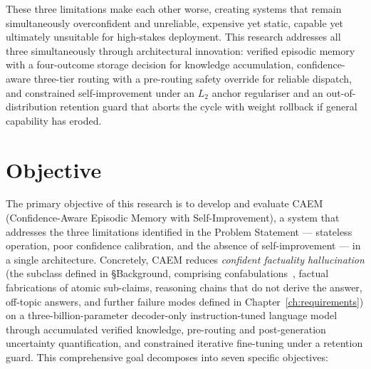 These three limitations make each other worse, creating systems that remain simultaneously overconfident and unreliable, expensive yet static, capable yet ultimately unsuitable for high-stakes deployment. This research addresses all three simultaneously through architectural innovation: verified episodic memory with a four-outcome storage decision for knowledge accumulation, confidence-aware three-tier routing with a pre-routing safety override for reliable dispatch, and constrained self-improvement under an $L_2$ anchor regulariser and an out-of-distribution retention guard that aborts the cycle with weight rollback if general capability has eroded.

\section{Objective}

The primary objective of this research is to develop and evaluate CAEM (Confidence-Aware Episodic Memory with Self-Improvement), a system that addresses the three limitations identified in the Problem Statement --- stateless operation, poor confidence calibration, and the absence of self-improvement --- in a single architecture. Concretely, CAEM reduces \textit{confident factuality hallucination} (the subclass defined in §Background, comprising confabulations~\cite{farquhar2024semantic}, factual fabrications of atomic sub-claims, reasoning chains that do not derive the answer, off-topic answers, and further failure modes defined in Chapter~\ref{ch:requirements}) on a three-billion-parameter decoder-only instruction-tuned language model through accumulated verified knowledge, pre-routing and post-generation uncertainty quantification, and constrained iterative fine-tuning under a retention guard. This comprehensive goal decomposes into seven specific objectives:

